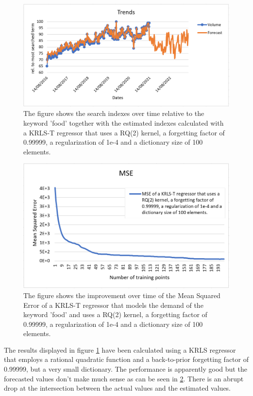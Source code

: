 \begin{figure}[H]
	\centering
	\includegraphics[scale=0.6]{img/exp4.png}
	\caption{The figure shows the search indexes over time relative to the keyword 'food' together with the estimated indexes calculated with a KRLS-T regressor that uses a RQ(2) kernel, a forgetting factor of 0.99999, a regularization of 1e-4 and a dictionary size of 100 elements.}
	\label{Implementation:Trends 4}
\end{figure} 

\begin{figure}[H]
	\centering
	\includegraphics[scale=0.7]{img/exp4_mse.png}
	\caption{The figure shows the improvement over time of the Mean Squared Error of a KRLS-T regressor that models the demand of the keyword 'food' and uses a RQ(2) kernel, a forgetting factor of 0.99999, a regularization of 1e-4 and a dictionary size of 100 elements.}
	\label{Implementation:MSE 4}
\end{figure} 

\newpage
The results displayed in figure \ref{Implementation:Trends 4} have been calculated using a \ac{KRLS} regressor that employs a rational quadratic function and a back-to-prior forgetting factor of 0.99999, but a very small dictionary. The performance is apparently good but the forecasted values don't make much sense as can be seen in \ref{Implementation:MSE 4}. There is an abrupt drop at the intersection between the actual values and the estimated values.

